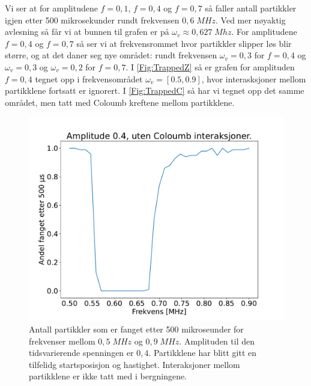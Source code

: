 \documentclass[reprint,english,notitlepage, nofootinbib]{revtex4-1}  %
\begin{document}
Vi ser at for amplitudene $f = 0,1$, $f = 0,4$ og $f=0,7$ så faller antall partikkler igjen etter 500 mikrosekunder rundt frekvensen $0,6 \; MHz$. Ved mer nøyaktig avlesning så får vi at bunnen til grafen er på $\omega_v \approx 0,627 \; Mhz$. For amplitudene $f=0,4$ og $f=0,7$ så ser vi at frekvensrommet hvor partikkler slipper løs blir større, og at det daner seg nye området: rundt frekvensen $\omega_v = 0,3$ for $f=0,4$ og $\omega_v = 0,3$ og $\omega_v=0,2$ for $f=0,7$. I \autoref{Fig:TrappedZ} så er grafen for amplituden $f = 0,4$ tegnet opp i frekvensområdet $\omega_v = [0.5, 0.9]$, hvor interasksjoner mellom partikklene fortsatt er ignorert. I \autoref{Fig:TrappedC} så har vi tegnet opp det samme området, men tatt med Coloumb kreftene mellom partikklene. 

\begin{figure}[H]
\centering
\includegraphics[scale=0.3]{../Images/TrappedZoomed.pdf}
\caption{Antall partikkler som er fanget etter 500 mikroseunder for frekvenser mellom $0,5 \; MHz$ og $0,9 \; MHz$. Amplituden til den tidsvarierende spenningen er $0,4$. Partikklene har blitt gitt en tilfelidg startsposisjon og hastighet. Interaksjoner mellom partikklene er ikke tatt med i bergningene.}
\label{Fig:TrappedZ}
\end{figure}
\end{document}
